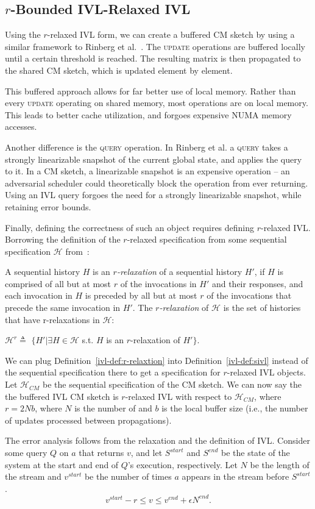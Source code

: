 \subsection{\texorpdfstring{$r$}{r}-Bounded IVL-Relaxed IVL}
\label{ivl-ssec:relaxed-cm}

Using the $r$-relaxed IVL form, we can create a buffered CM sketch
by using a similar framework to Rinberg et al.~\cite{rinberg2019fast}. The
\textsc{update} operations are buffered locally until a certain threshold
is reached. The resulting matrix is then propagated to the shared CM sketch,
which is updated element by element. 

This buffered approach allows for far better use of local memory. Rather than every
\textsc{update} operating on shared memory, most operations are on local memory. This
leads to better cache utilization, and forgoes expensive NUMA memory accesses.

Another difference is the \textsc{query} operation. In Rinberg et al. a \textsc{query}
takes a strongly linearizable snapshot of the current global state, and applies the query
to it.  In a CM sketch, a linearizable snapshot is an expensive operation -- an adversarial
scheduler could theoretically block the operation from ever returning. Using an IVL query
forgoes the need for a strongly linearizable snapshot, while retaining error bounds.

Finally, defining the correctness of such an object requires defining $r$-relaxed IVL.
Borrowing the definition of the $r$-relaxed specification from some sequential specification
$\mathcal{H}$ from~\cite{rinberg2019fast}:
\begin{definition}[r-relaxation]
    A sequential history $H$ is an \emph{$r$-relaxation} of a sequential history $H'$,
    if $H$ is comprised of all but at most $r$ of the invocations in $H'$ and their responses,
    and each invocation in $H$ is preceded by all but at most $r$ of the invocations that precede the 
    same invocation in $H'$. The \emph{$r$-relaxation} of $\mathcal{H}$ is the set of histories
    that have r-relaxations in $\mathcal{H}$:
    
    $\mathcal{H}^r \triangleq $ $\{H'|\exists H\in$$\mathcal{H}$ s.t. $H$ is an $r$-relaxation of $H'\}$.
    \label{ivl-def:r-relaxtion}
\end{definition}
We can plug Definition~\ref{ivl-def:r-relaxtion} into Definition~\ref{ivl-def:sivl} instead of the sequential specification
there to get a specification for $r$-relaxed IVL objects. Let $\mathcal{H}_{CM}$ be the sequential specification of
the CM sketch. We can now say the the buffered IVL CM sketch is $r$-relaxed IVL with respect to $\mathcal{H}_{CM}$, where
$r=2Nb$, where $N$ is the number of  and $b$ is the local buffer size (i.e., the number of updates processed
between propagations).

The error analysis follows from the relaxation and the definition of IVL. Consider some query $Q$ on $a$
that returns $v$, and let $S^{start}$ and $S^{end}$ be the state of the system at the start and end of
$Q$'s execution, respectively. Let $N$ be the length of the stream and $v^{start}$ be the number of times $a$ appears in the stream before $S^{start}$.
\[ v^{start} - r \leq v \leq  v^{end} + \epsilon N^{end}. \]